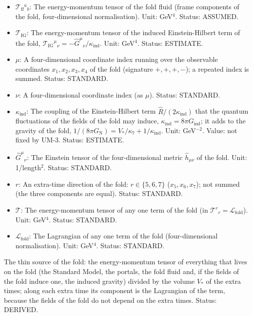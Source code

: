 \documentclass[
  10pt,
]{article}
\begin{document}
\begin{itemize}
\item
  \(\mathcal{T}_{\mathrm{ff}}{}^a{}_b\): The energy-momentum tensor of
  the fold fluid (frame components of the fold, four-dimensional
  normalisation). Unit: GeV\(^4\). Status: ASSUMED.
\item
  \(\mathcal{T}_{\mathrm{IG}}\): The energy-momentum tensor of the
  induced Einstein-Hilbert term of the fold,
  \(\mathcal{T}_{\mathrm{IG}}{}^\mu{}_\nu = -\hat G^\mu{}_\nu/\kappa_{\mathrm{ind}}\).
  Unit: GeV\(^4\). Status: ESTIMATE.
\item
  \(\mu\): A four-dimensional coordinate index running over the
  observable coordinates \(x_1, x_2, x_3, x_4\) of the fold (signature
  \(+,+,+,-\)); a repeated index is summed. Status: STANDARD.
\item
  \(\nu\): A four-dimensional coordinate index (as \(\mu\)). Status:
  STANDARD.
\item
  \(\kappa_{\mathrm{ind}}\): The coupling of the Einstein-Hilbert term
  \(\hat R/(2\kappa_{\mathrm{ind}})\) that the quantum fluctuations of
  the fields of the fold may induce,
  \(\kappa_{\mathrm{ind}} = 8\pi G_{\mathrm{ind}}\); it adds to the
  gravity of the fold,
  \(1/(8\pi G_{\mathrm{N}}) = V_*/\kappa_7 + 1/\kappa_{\mathrm{ind}}\).
  Unit: GeV\(^{-2}\). Value: not fixed by UM-3. Status: ESTIMATE.
\item
  \(\hat G^\mu{}_\nu\): The Einstein tensor of the four-dimensional
  metric \(\hat h_{\mu\nu}\) of the fold. Unit: 1/length\(^2\). Status:
  STANDARD.
\item
  \(r\): An extra-time direction of the fold: \(r \in \{5, 6, 7\}\)
  (\(x_5, x_6, x_7\)); not summed (the three components are equal).
  Status: STANDARD.
\item
  \(\mathcal{T}\): The energy-momentum tensor of any one term of the
  fold (in \(\mathcal{T}^r{}_r = \mathcal{L}_{\mathrm{fold}}\)). Unit:
  GeV\(^4\). Status: STANDARD.
\item
  \(\mathcal{L}_{\mathrm{fold}}\): The Lagrangian of any one term of the
  fold (four-dimensional normalisation). Unit: GeV\(^4\). Status:
  STANDARD.
\end{itemize}

The thin source of the fold: the energy-momentum tensor of everything
that lives on the fold (the Standard Model, the portals, the fold fluid
and, if the fields of the fold induce one, the induced gravity) divided
by the volume \(V_*\) of the extra times; along each extra time its
component is the Lagrangian of the term, because the fields of the fold
do not depend on the extra times. Status: DERIVED.
\end{document}
